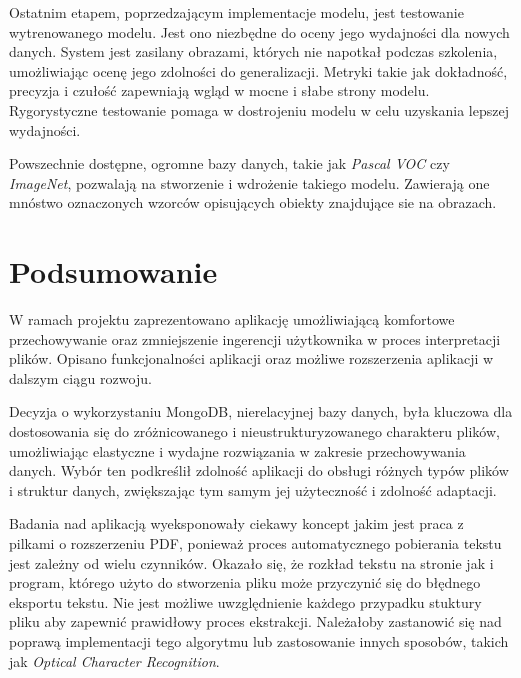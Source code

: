 \documentclass[12pt,a4paper,twoside]{article}
\begin{document}
Ostatnim etapem, poprzedzającym implementacje modelu, jest testowanie wytrenowanego modelu. Jest ono niezbędne do oceny jego wydajności dla nowych danych. System jest zasilany obrazami, których nie napotkał podczas szkolenia, umożliwiając ocenę jego zdolności do generalizacji. Metryki takie jak dokładność, precyzja i czułość zapewniają wgląd w mocne i słabe strony modelu. Rygorystyczne testowanie pomaga w dostrojeniu modelu w celu uzyskania lepszej wydajności.\par
Powszechnie dostępne, ogromne bazy danych, takie jak \textit{Pascal VOC} czy \textit{ImageNet}, pozwalają na stworzenie i wdrożenie takiego modelu. Zawierają one mnóstwo oznaczonych wzorców opisujących obiekty znajdujące sie na obrazach. 
\newpage
\section*{Podsumowanie}
W ramach projektu zaprezentowano aplikację umożliwiającą komfortowe przechowywanie oraz zmniejszenie ingerencji użytkownika w proces interpretacji plików. Opisano funkcjonalności aplikacji oraz możliwe rozszerzenia  aplikacji w dalszym ciągu rozwoju. \par
Decyzja o wykorzystaniu MongoDB, nierelacyjnej bazy danych, była kluczowa dla dostosowania się do zróżnicowanego i nieustrukturyzowanego charakteru plików, umożliwiając elastyczne i wydajne rozwiązania w zakresie przechowywania danych. Wybór ten podkreślił zdolność aplikacji do obsługi różnych typów plików i struktur danych, zwiększając tym samym jej użyteczność i zdolność adaptacji.\par
Badania nad aplikacją wyeksponowały ciekawy koncept jakim jest praca z pilkami o rozszerzeniu PDF, ponieważ proces automatycznego pobierania tekstu jest zależny od wielu czynników. Okazało się, że rozkład tekstu na stronie jak i program, którego użyto do stworzenia pliku może przyczynić się do błędnego eksportu tekstu. Nie jest możliwe uwzględnienie każdego przypadku stuktury pliku aby zapewnić prawidłowy proces ekstrakcji. Należałoby zastanowić się nad poprawą implementacji tego algorytmu lub zastosowanie innych sposobów, takich jak \textit{Optical Character Recognition}.
\newpage
\listoffigures
{}


\end{document}
